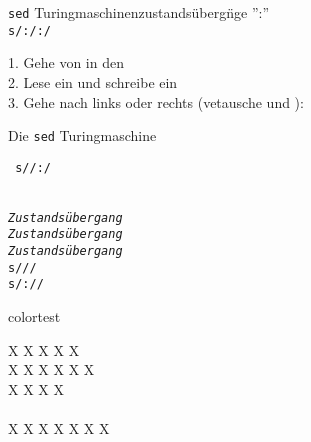 \documentclass[aspectratio=169,usenames,dvipsnames]{beamer}
\begin{document}
\begin{frame}{{\tt sed} Turingmaschinenzustands\"uberg\"nge}
	\hspace{8em}
	'':''\\\pause
	\bigskip
	\texttt{s/\only<3->:\only<6->\only<5->\only<5->\only<4->\only<6->/\only<3->:\only<6->\only<5->\only<5->\only<4->\only<6->/}\\
	\pause
	\bigskip

	1. Gehe von  in den \\\pause
	{2. Lese ein  und schreibe ein }\\\pause
	{3. Gehe nach links oder rechts (vetausche  und ):}\\\pause
	
\end{frame}

\begin{frame}{ Die {\tt sed} Turingmaschine}
	
	\tt
	s//:/\\\pause
	~\\
	~\\
	\textit{Zustands\"ubergang}\only<3->{ ; t nochmal}\\
	\textit{Zustands\"ubergang}\\
	\textit{Zustands\"ubergang}\\
	\pause\pause
	s///\\\pause
	s/://\\

\end{frame}

\begin{frame}{colortest}

	{ \color{BrickRed} X}
	{ \color{red} X}
	{ \color{Maroon} X}
	{ \color{Brown} X}
	{ \color{Sepia} X}
	\\
	{ \color{PineGreen} X}
	{ \color{OliveGreen} X}
	{ \color{ForestGreen} X}
	{ \color{LimeGreen} X}
	{ \color{RoyalBlue} X}
	{ \color{NavyBlue} X}
	\\
	{ \color{BurntOrange} X}
	{ \color{YellowOrange} X}
	{ \color{Yellow} X}
	{ \color{Goldenrod} X}
	\\
	\\
	{ \color{YellowOrange} X}
	{ \color{NavyBlue} X}
	{ \color{red} X}
	{ \color{Violet} X}
	{ \color{OliveGreen} X}
	{ \color{CadetBlue} X}
	{ \color{Gray} X}
\end{frame}
\end{document}
